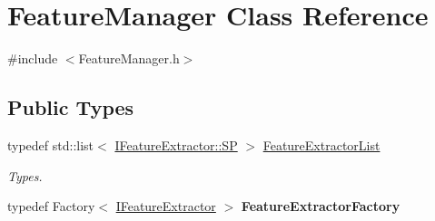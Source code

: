 \hypertarget{class_feature_manager}{}\section{Feature\+Manager Class Reference}
\label{class_feature_manager}


{\ttfamily \#include $<$Feature\+Manager.\+h$>$}

\subsection*{Public Types}
\begin{DoxyCompactItemize}
\item 
\mbox{\label{class_feature_manager_ac5e551b04984aaab5e31391e934208bb}} 
typedef std\+::list$<$ \hyperlink{class_i_feature_extractor_accaef91768ee64d51b4dc959f36e9f08}{I\+Feature\+Extractor\+::\+SP} $>$ \hyperlink{class_feature_manager_ac5e551b04984aaab5e31391e934208bb}{Feature\+Extractor\+List}
\begin{DoxyCompactList}\small\item\em Types. \end{DoxyCompactList}\item 
\mbox{\label{class_feature_manager_a8d757b7e1c0e8a173e42981a79898b73}} 
typedef Factory$<$ \hyperlink{class_i_feature_extractor}{I\+Feature\+Extractor} $>$ {\bfseries Feature\+Extractor\+Factory}
\end{DoxyCompactItemize}

